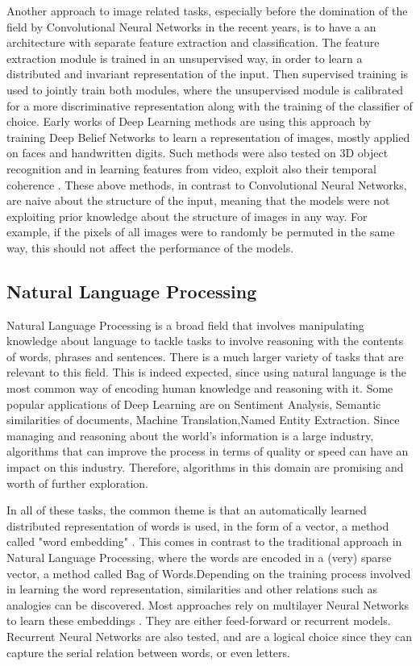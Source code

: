 \documentclass[a4paper]{article}
\begin{document}
		Another approach to image related tasks, especially before the domination of the field by Convolutional Neural Networks in the recent years, is to have a an architecture with separate feature extraction and classification. The feature extraction module is trained in an unsupervised way, in order to learn a distributed and invariant representation of the input. Then supervised training is used to jointly train both modules, where the unsupervised module is calibrated for a more discriminative representation along with the training of the classifier of choice. Early works of Deep Learning methods are using this approach \cite{Hinton2006,Bengio2007a,Lee2011} by training Deep Belief Networks to learn a representation of images, mostly applied on faces and handwritten digits. Such methods were also tested on 3D object recognition \cite{Nair2009} and in learning features from video, exploit also their temporal coherence \cite{Mobahi2009}.
		These above methods, in contrast to Convolutional Neural Networks, are naive about the structure of the input, meaning that the models were not exploiting prior knowledge about the structure of images in any way. For example, if the pixels of all images were to randomly be permuted in the same way, this should not affect the performance of the models.
			
	\subsection{Natural Language Processing}
	\label{sec: NLP_Audio}
		Natural Language Processing is a broad field that involves manipulating knowledge about language to tackle tasks to involve reasoning with the contents of words, phrases and sentences. There is a much larger variety of tasks that are relevant to this field. This is indeed expected, since using natural language is the most common way of encoding human knowledge and reasoning with it. 
		Some popular applications of Deep Learning are on Sentiment Analysis, Semantic similarities of documents, Machine Translation,Named Entity Extraction. Since managing and reasoning about the world's information is a large industry, algorithms that can improve the process in terms of quality or speed can have an impact on this industry. Therefore, algorithms in this domain are promising and worth of further exploration.
		
		In all of these tasks, the common theme is that an automatically learned distributed representation of words is used, in the form of a vector, a method called "word embedding" \cite{Collobert2008}. This comes in contrast to the traditional approach in Natural Language Processing, where the words are encoded in a (very) sparse vector, a method called Bag of Words.Depending on the training process involved in learning the word representation, similarities and other relations such as analogies can be discovered. Most approaches rely on multilayer Neural Networks to learn these embeddings \cite{Collobert2008,Collobert 2011}. They are either feed-forward or recurrent models. Recurrent Neural Networks are  also tested, and are a logical choice since they can capture the serial relation between words, or even letters. 
		 
\end{document}
